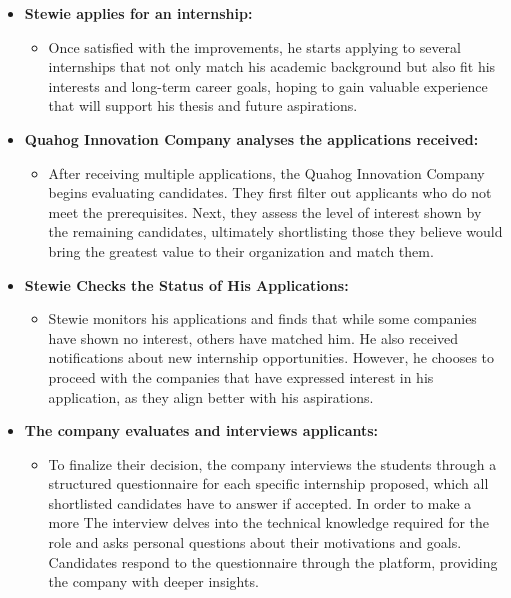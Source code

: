 \begin{itemize}[leftmargin=*, label={}]
    \item \textbf{Stewie applies for an internship:}
    \begin{itemize}
        \item  Once satisfied with the improvements, he starts applying to several internships that not only match his academic background but also fit his interests and long-term career goals, hoping to gain valuable experience that will support his thesis and future aspirations.
    \end{itemize}

    \item \textbf{Quahog Innovation Company analyses the applications received:}
    \begin{itemize}
        \item After receiving multiple applications, the Quahog  Innovation Company begins evaluating candidates. They first filter out applicants who do not meet the prerequisites. Next, they assess the level of interest shown by the remaining candidates, ultimately shortlisting those they believe would bring the greatest value to their organization and match them.
    \end{itemize}

    \item \textbf{Stewie Checks the Status of His Applications:}
    \begin{itemize}
        \item Stewie monitors his applications and finds that while some companies have shown no interest, others have matched him. He also received notifications about new internship opportunities. However, he chooses to proceed with the companies that have expressed interest in his application, as they align better with his aspirations.
    \end{itemize}

    \item \textbf{The company evaluates and interviews applicants:}
    \begin{itemize}
        \item To finalize their decision, the company interviews the students through a structured questionnaire for each specific internship proposed, which all shortlisted candidates have to answer if accepted. In order to make a more The interview delves into the technical knowledge required for the role and asks personal questions about their motivations and goals. Candidates respond to the questionnaire through the platform, providing the company with deeper insights.
    \end{itemize}


\end{itemize}
